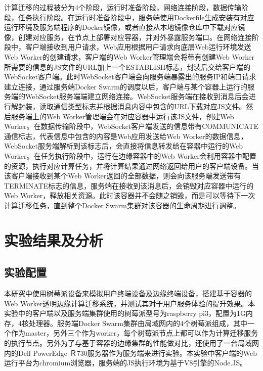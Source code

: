 计算迁移的过程被分为4个阶段，运行时准备阶段，网络连接阶段，数据传输阶段，任务执行阶段。在运行时准备阶段中，服务端使用Dockerfile生成安装有对应运行环境及服务端程序的Docker镜像，或者直接从本地镜像仓库中下载对应镜像，创建对应服务，在节点上部署对应容器，并对外暴露服务端口。在网络连接阶段中，客户端接收到用户请求，Web应用根据用户请求向底层Web运行环境发送Web Worker的创建请求，客户端的Web Worker管理端会将带有创建Web Worker所需要的信息的JS文件的URL加上一个ESTABLISH标志，封装后交给客户端的WebSocket客户端。此时WebSocket客户端会向服务端暴露出的服务IP和端口请求建立连接，通过服务端Docker Swarm的调度以后，客户端与某个容器上运行的服务端的WebSocket服务端端建立网络连接。WebSocket服务端在接收到消息后会进行解封装，读取通信类型标志并根据消息内容中包含的URL下载对应JS文件。然后服务端上的Web Worker管理端会在对应容器中运行该JS文件，创建Web Worker。在数据传输阶段中，WebSocket客户端发送的信息带有COMMUNICATE通信标志，代表信息中包含的内容是Web应用发送给Web Worker的数据信息，WebSocket服务端解析到该标志后，会直接将信息转发给在容器中运行的Web Worker。在任务执行阶段中，运行在边缘容器中的Web Worker会利用容器中配置的资源，执行对应计算任务，并将计算结果通过网络返回给用户的客户端设备。当该客户端接收到某个Web Worker返回的全部数据，则会向该服务端发送带有TERMINATE标志的信息，服务端在接收到该消息后，会销毁对应容器中运行的Web Worker，释放相关资源。此时该容器并不会随之销毁，而是可以等待下一次计算迁移任务，直到整个Docker Swarm集群对该容器的生命周期进行调整。

\section{实验结果及分析}\label{sec:computation_offloading_experiment_results}

\subsection{实验配置}

本研究中使用树莓派设备来模拟用户终端设备及边缘终端设备，搭建基于容器的Web Worker透明边缘计算迁移系统，并测试其对于用户服务体验的提升效果。本实验中的客户端以及服务端集群使用的树莓派型号为raspberry pi3，配置为1G内存，4核处理器。服务端Docker Swarm集群由局域网内的4个树莓派组成，其中一个作为master，另外三个作为worker，每个树莓派节点上都可以作为计算迁移服务的执行节点。另外为了与基于容器的边缘集群的性能做对比，还使用了一台局域网内的Dell PowerEdge Ｒ730服务器作为服务端来进行实验。本实验中客户端的Web运行平台为chromium浏览器，服务端的JS执行环境为基于V8引擎的Node.JS。

